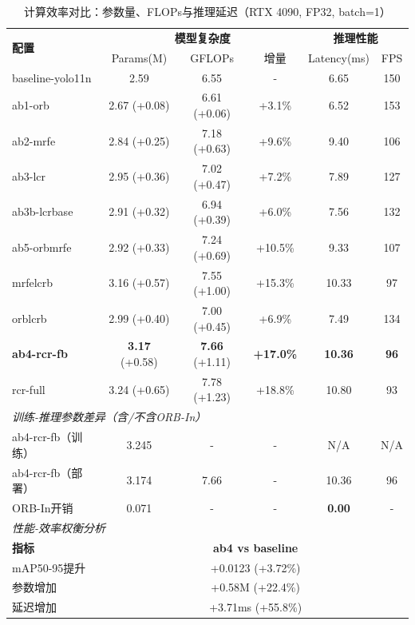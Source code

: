 
\begin{table}[t]
\centering
\caption{计算效率对比：参数量、FLOPs与推理延迟（RTX 4090, FP32, batch=1）}
\label{tab:efficiency}
\begin{tabular}{l|ccc|cc}
\hline
\multirow{2}{*}{\textbf{配置}} & \multicolumn{3}{c|}{\textbf{模型复杂度}} & \multicolumn{2}{c}{\textbf{推理性能}} \\
& Params(M) & GFLOPs & 增量 & Latency(ms) & FPS \\
\hline
\hline
baseline-yolo11n & 2.59 & 6.55 & - & 6.65 & 150 \\
\hline
ab1-orb & 2.67 (+0.08) & 6.61 (+0.06) & +3.1\% & 6.52 & 153 \\
ab2-mrfe & 2.84 (+0.25) & 7.18 (+0.63) & +9.6\% & 9.40 & 106 \\
ab3-lcr & 2.95 (+0.36) & 7.02 (+0.47) & +7.2\% & 7.89 & 127 \\
ab3b-lcrbase & 2.91 (+0.32) & 6.94 (+0.39) & +6.0\% & 7.56 & 132 \\
\hline
ab5-orbmrfe & 2.92 (+0.33) & 7.24 (+0.69) & +10.5\% & 9.33 & 107 \\
mrfelcrb & 3.16 (+0.57) & 7.55 (+1.00) & +15.3\% & 10.33 & 97 \\
orblcrb & 2.99 (+0.40) & 7.00 (+0.45) & +6.9\% & 7.49 & 134 \\
\hline
\textbf{ab4-rcr-fb} & \textbf{3.17} (+0.58) & \textbf{7.66} (+1.11) & \textbf{+17.0\%} & \textbf{10.36} & \textbf{96} \\
rcr-full & 3.24 (+0.65) & 7.78 (+1.23) & +18.8\% & 10.80 & 93 \\
\hline
\hline
\multicolumn{6}{l}{\textit{训练-推理参数差异（含/不含ORB-In）}} \\
\hline
ab4-rcr-fb（训练） & 3.245 & - & - & N/A & N/A \\
ab4-rcr-fb（部署） & 3.174 & 7.66 & - & 10.36 & 96 \\
ORB-In开销 & 0.071 & - & - & \textbf{0.00} & - \\
\hline
\hline
\multicolumn{6}{l}{\textit{性能-效率权衡分析}} \\
\hline
\textbf{指标} & \multicolumn{5}{c}{\textbf{ab4 vs baseline}} \\
\hline
mAP50-95提升 & \multicolumn{5}{c}{+0.0123 (+3.72\%)} \\
参数增加 & \multicolumn{5}{c}{+0.58M (+22.4\%)} \\
延迟增加 & \multicolumn{5}{c}{+3.71ms (+55.8\%)} \\

\end{tabular}
\end{table}
